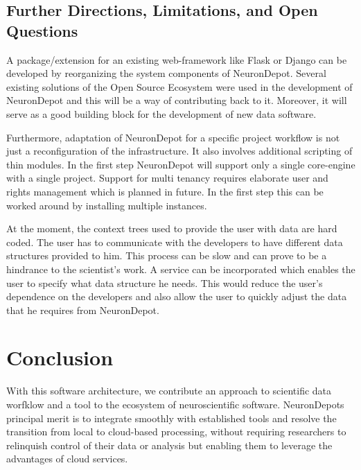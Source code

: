\documentclass{frontiersSCNS} %
\begin{document}
\subsection{Further Directions, Limitations, and Open Questions}

A package/extension for an existing web-framework like Flask or Django can be
developed by reorganizing the system components of NeuronDepot. Several
existing solutions of the Open Source Ecosystem were used in the development of
NeuronDepot and this will be a way of contributing back to it. Moreover, it
will serve as a good building block for the development of new data software.

Furthermore, adaptation of NeuronDepot for a specific project workflow is not
just a reconfiguration of the infrastructure. It also involves additional
scripting of thin modules. In the first step NeuronDepot will support only a
single core-engine with a single project. Support for multi tenancy
requires elaborate user and rights management which is planned in future. In
the first step this can be worked around by installing multiple instances.

At the moment, the context trees used to provide the user with data are hard
coded. The user has to communicate with the developers to have different data
structures provided to him. This process can be slow and can prove to be a
hindrance to the scientist's work. A service can be incorporated which enables
the user to specify what data structure he needs. This would reduce the user's
dependence on the developers and also allow the user to quickly adjust the data
that he requires from NeuronDepot.

\section{Conclusion}
With this software architecture, we contribute an approach to scientific data
worfklow and a tool to the ecosystem of neuroscientific software.  NeuronDepots
principal merit is to integrate smoothly with established tools and resolve the
transition from local to cloud-based processing, without requiring researchers
to relinquish control of their data or analysis but enabling them to leverage
the advantages of cloud services.
\end{document}
